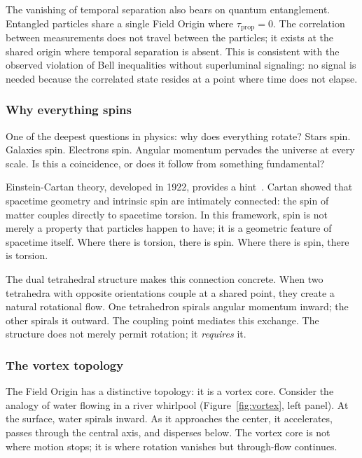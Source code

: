 \documentclass[aps,prd,preprint,superscriptaddress,showpacs,preprintnumbers,amsmath,amssymb,nofootinbib]{revtex4-2}
\begin{document}
The vanishing of temporal separation also bears on quantum entanglement. Entangled particles share a single Field Origin where $\tau_{\text{prop}} = 0$. The correlation between measurements does not travel between the particles; it exists at the shared origin where temporal separation is absent. This is consistent with the observed violation of Bell inequalities without superluminal signaling: no signal is needed because the correlated state resides at a point where time does not elapse.

\subsubsection*{Why everything spins}

One of the deepest questions in physics: why does everything rotate? Stars spin. Galaxies spin. Electrons spin. Angular momentum pervades the universe at every scale. Is this a coincidence, or does it follow from something fundamental?

Einstein-Cartan theory, developed in 1922, provides a hint~\cite{hehl1976}. Cartan showed that spacetime geometry and intrinsic spin are intimately connected: the spin of matter couples directly to spacetime torsion. In this framework, spin is not merely a property that particles happen to have; it is a geometric feature of spacetime itself. Where there is torsion, there is spin. Where there is spin, there is torsion.

The dual tetrahedral structure makes this connection concrete. When two tetrahedra with opposite orientations couple at a shared point, they create a natural rotational flow. One tetrahedron spirals angular momentum inward; the other spirals it outward. The coupling point mediates this exchange. The structure does not merely permit rotation; it \emph{requires} it.

\subsubsection*{The vortex topology}

The Field Origin has a distinctive topology: it is a vortex core. Consider the analogy of water flowing in a river whirlpool (Figure~\ref{fig:vortex}, left panel). At the surface, water spirals inward. As it approaches the center, it accelerates, passes through the central axis, and disperses below. The vortex core is not where motion stops; it is where rotation vanishes but through-flow continues.
\end{document}
